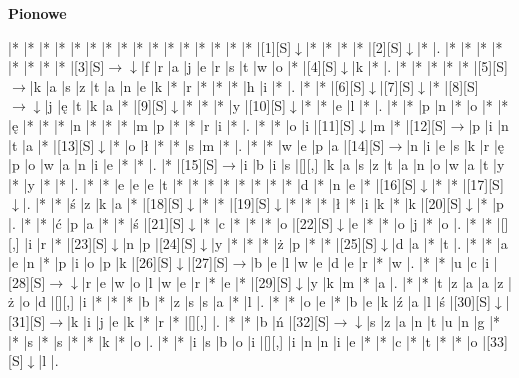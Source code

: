 \documentclass[11pt]{article}
\newcommand\drarr{$\rightarrow \!\!\!\!\! \downarrow$}
\newcommand\rarr{$\rightarrow$}
\newcommand\darr{$\downarrow$}
\begin{document}
\begin{PuzzleClues}{\textbf{Pionowe}\\}
\end{PuzzleClues}\newpage%

\noindent\begin{Puzzle}{22}{32}|*	|*	|*	|*	|*	|*	|*	|*	|*	|*	|*	|*	|*	|*	|*	|*	|[1][S]\darr	|*	|*	|*	|*	|[2][S]\darr	|*	|.
|*	|*	|*	|*	|*	|*	|*	|*	|[3][S]\drarr	|f	|r	|a	|j	|e	|r	|s	|t	|w	|o	|*	|[4][S]\darr	|k	|*	|.
|*	|*	|*	|*	|*	|[5][S]\rarr	|k	|a	|s	|z	|t	|a	|n	|e	|k	|*	|r	|*	|*	|*	|h	|i	|*	|.
|*	|*	|[6][S]\darr	|[7][S]\darr	|*	|[8][S]\drarr	|j	|ę	|t	|k	|a	|*	|[9][S]\darr	|*	|*	|*	|y	|[10][S]\darr	|*	|*	|e	|l	|*	|.
|*	|*	|p	|n	|*	|o	|*	|*	|ę	|*	|*	|*	|n	|*	|*	|*	|m	|p	|*	|*	|r	|i	|*	|.
|*	|*	|o	|i	|[11][S]\darr	|m	|*	|[12][S]\rarr	|p	|i	|n	|t	|a	|*	|[13][S]\darr	|*	|o	|ł	|*	|*	|s	|m	|*	|.
|*	|*	|w	|e	|p	|a	|[14][S]\rarr	|n	|i	|e	|s	|k	|r	|ę	|p	|o	|w	|a	|n	|i	|e	|*	|*	|.
|*	|[15][S]\rarr	|i	|b	|i	|s	|[][,]{ }	|k	|a	|s	|z	|t	|a	|n	|o	|w	|a	|t	|y	|*	|y	|*	|*	|.
|*	|*	|e	|e	|e	|t	|*	|*	|*	|*	|*	|*	|*	|*	|d	|*	|n	|e	|*	|[16][S]\darr	|*	|*	|[17][S]\darr	|.
|*	|*	|ś	|z	|k	|a	|*	|[18][S]\darr	|*	|*	|[19][S]\darr	|*	|*	|*	|ł	|*	|i	|k	|*	|k	|[20][S]\darr	|*	|p	|.
|*	|*	|ć	|p	|a	|*	|*	|ś	|[21][S]\darr	|*	|c	|*	|*	|*	|o	|[22][S]\darr	|e	|*	|*	|o	|j	|*	|o	|.
|*	|*	|[][,]{ }	|i	|r	|*	|[23][S]\darr	|n	|p	|[24][S]\darr	|y	|*	|*	|*	|ż	|p	|*	|*	|[25][S]\darr	|d	|a	|*	|t	|.
|*	|*	|a	|e	|n	|*	|p	|i	|o	|p	|k	|[26][S]\darr	|[27][S]\rarr	|b	|e	|l	|w	|e	|d	|e	|r	|*	|w	|.
|*	|*	|u	|c	|i	|[28][S]\drarr	|r	|e	|w	|o	|l	|w	|e	|r	|*	|e	|*	|[29][S]\darr	|y	|k	|m	|*	|a	|.
|*	|*	|t	|z	|a	|a	|z	|ż	|o	|d	|[][,]{ }	|i	|*	|*	|*	|b	|*	|z	|s	|s	|a	|*	|l	|.
|*	|*	|o	|e	|*	|b	|e	|k	|ź	|a	|l	|ś	|[30][S]\darr	|[31][S]\rarr	|k	|i	|j	|e	|k	|*	|r	|*	|[][,]{ }	|.
|*	|*	|b	|ń	|[32][S]\drarr	|s	|z	|a	|n	|t	|u	|n	|g	|*	|*	|s	|*	|s	|*	|*	|k	|*	|o	|.
|*	|*	|i	|s	|b	|o	|i	|[][,]{ }	|i	|n	|n	|i	|e	|*	|*	|c	|*	|t	|*	|*	|o	|[33][S]\darr	|l	|.

\end{Puzzle}
\end{document}
